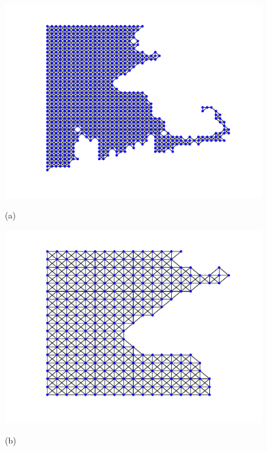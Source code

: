 \documentclass[journal, 10pt]{IEEEtran}
\begin{document}
\begin{figure}[tb] 
\begin{minipage}[m]{0.24\linewidth}
\centerline{\includegraphics[width=1\linewidth]{fig_temp_graph_structure}}
\vspace{-.2in}
\centerline{\small{(a)}}
\end{minipage}
\begin{minipage}[m]{0.24\linewidth}
\centerline{\includegraphics[width=1\linewidth]{fig_temp_structure_bos}}
\vspace{-.2in}
\centerline{\small{(b)}}
\end{minipage} %
\begin{minipage}[m]{0.24\linewidth}

\end{minipage}
\end{figure}
\end{document}
